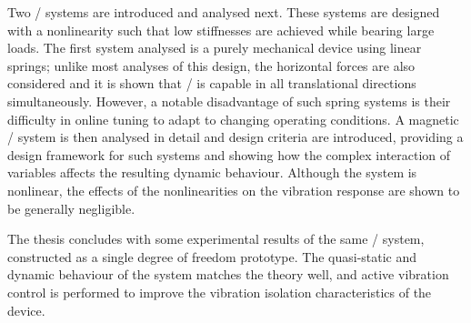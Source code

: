 \documentclass[10pt,a4paper]{memoir}
\begin{document}
Two \qzs/ systems are introduced and analysed next.
These systems are designed with a nonlinearity such that low stiffnesses are achieved while bearing large loads.
The first system analysed is a purely mechanical device using linear springs; unlike most analyses of this design, the horizontal forces are also considered and it is shown that \qzs/ is capable in all translational directions simultaneously.
However, a notable disadvantage of such spring systems is their difficulty in online tuning to adapt to changing operating conditions.
A magnetic \qzs/ system is then analysed in detail and design criteria are introduced, providing a design framework for such systems and showing how the complex interaction of variables affects the resulting dynamic behaviour.
Although the system is nonlinear, the effects of the nonlinearities on the vibration response are shown to be generally negligible.

The thesis concludes with some experimental results of the same \qzs/ system, constructed as a single degree of freedom prototype.
The quasi-static and dynamic behaviour of the system matches the theory well, and active vibration control is performed to improve the vibration isolation characteristics of the device.

\normalsize
\end{document}
